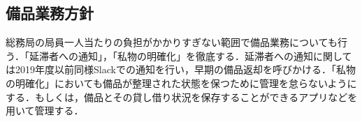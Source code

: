 \subsection*{備品業務方針}

総務局の局員一人当たりの負担がかかりすぎない範囲で備品業務についても行う．「延滞者への通知」，「私物の明確化」を徹底する．延滞者への通知に関しては2019年度以前同様Slackでの通知を行い，早期の備品返却を呼びかける．「私物の明確化」においても備品が整理された状態を保つために管理を怠らないようにする．もしくは，備品とその貸し借り状況を保存することができるアプリなどを用いて管理する．

